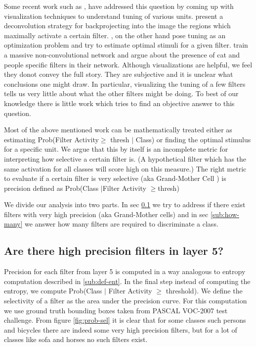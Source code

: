 \documentclass[runningheads]{llncs}
\begin{document}
Some recent work such as \cite{DeConv}, \cite{Simonyan} have addressed this question by coming up with visualization techniques to understand tuning of various units. \cite{DeConv} present a deconvolution strategy for backprojecting into the image the regions which maximally activate a certain filter.  \cite{Simonyan}, on the other hand pose tuning as an optimization problem and try to estimate optimal stimuli for a given filter. \cite{GoogleCat} train a massive non-convolutional network and argue about the presence of cat and people specific filters in their network. Although visualizations are helpful, we feel they donot convey the full story. They are subjective and it is unclear what conclusions one might draw. In particular, visualizing the tuning of a few filters tells us very little about what the other filters might be doing. To best of our knowledge there is little work which tries to find an objective answer to this question.

Most of the above mentioned work can be mathematically treated either as estimating Prob(Filter Activity$\geq$ thresh $|$ Class) or finding the optimal stimulus for a specific unit. We argue that this by itself is an incomplete metric for interpreting how selective a certain filter is. (A hypothetical filter which has the same activation for all classes will score high on this measure.)  The right metric to evaluate if a certain filter is very selective (aka Grand-Mother Cell \cite{Barlow}) is precision defined as Prob(Class $|$Filter Activity $\geq$thresh)

We divide our analysis into two parts. In sec \ref{sub:class-specific-unit} we try to address if there exist filters with very high precision (aka Grand-Mother cells) and in sec \ref{sub:how-many} we answer how many filters are required to discriminate a class. 

\subsection{Are there high precision filters in layer 5?}
\label{sub:class-specific-unit}
Precision for each filter from layer 5 is computed in a way analogous to entropy computation described in \ref{sub:def-ent}. In the final step instead of computing the entropy, we compute Prob(Class $|$ Filter Activity $\geq$ threshold). We define the selectivity of a filter as the area under the precision curve. For this computation we use ground truth bounding boxes taken from PASCAL VOC-2007 test challenge.
From figure \ref{fig:prob-sel} it is clear that for some classes such persons and bicycles there are indeed some very high precision filters, but for a lot of classes like sofa and horses no such filters exist. 
\end{document}

